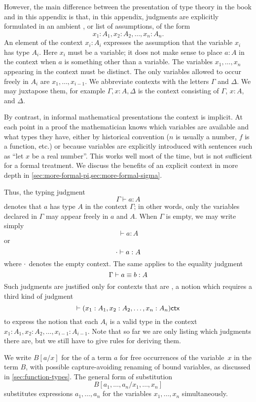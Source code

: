 However, the main difference between the presentation of type theory in the book
and in this appendix is that, in this appendix, judgments are explicitly
formulated in an ambient , or list of assumptions, of the form
\[
  x_1:A_1, x_2:A_2,\dots,x_n:A_n.
\]
An element of the context $x_i : A_i$ expresses the assumption that the
variable $x_i$ has type $A_i$. Here $x_i$ must be a variable; it does
not make sense to place $a : A$ in the context when $a$ is something
other than a variable.  The variables $x_1, \ldots, x_n$ appearing in
the context must be distinct. The only variables allowed to
occur freely in $A_i$ are $x_1, \ldots, x_{i-1}$.
We abbreviate contexts with the letters $\Gamma$ and $\Delta$. We
may juxtapose them, for example $\Gamma, x : A, \Delta$ is the context
consisting of $\Gamma$, $x : A$, and $\Delta$.

By contrast, in informal mathematical presentations the context is
implicit. At each point in a proof the mathematician knows which
variables are available and what types they have, either by historical
convention ($n$ is usually a number, $f$ is a function, etc.) or
because variables are explicitly introduced with sentences such as
``let $x$ be a real number''. This works well most of the time, but
is not sufficient for a formal treatment. We discuss the benefits of an explicit 
context in more depth in \autoref{sec:more-formal-pi,sec:more-formal-sigma}.

Thus, the typing judgment
\[
  \Gamma \vdash a:A
\]
denotes that $a$ has type $A$ in the context $\Gamma$; in other words, only the
variables declared in $\Gamma$ may appear freely in $a$ and $A$. When $\Gamma$
is empty, we may write simply
\[
  \vdash a:A
\]
or
\[
  \cdot \vdash a:A
\]
where $\cdot$ denotes the empty context. The same applies to the equality
judgment
\[
  \Gamma \vdash a\equiv b:A
\]
%
Such judgments are justified only for contexts that are , a notion which requires a third kind of judgment
\[
  \vdash (x_1:A_1, x_2:A_2,\dots,x_n:A_n) \mathsf{ctx}
\]
to express the notion that each $A_i$ is a valid
type in the context $x_1:A_1, x_2:A_2,\dots,x_{i-1}:A_{i-1}$. Note
that so far we are only listing which judgments there are, but we
still have to give rules for deriving them.

We write $B[a/x]$ for the  of a term $a$ for free occurrences of
the variable~$x$ in the term $B$, with possible capture-avoiding
renaming of bound variables, as discussed in
\autoref{sec:function-types}. The general form of substitution
%
\[
   B[a_1,\dots,a_n/x_1,\dots,x_n]
\]
%
substitutes expressions $a_1,\dots,a_n$ for the variables
$x_1,\dots,x_n$ simultaneously.

